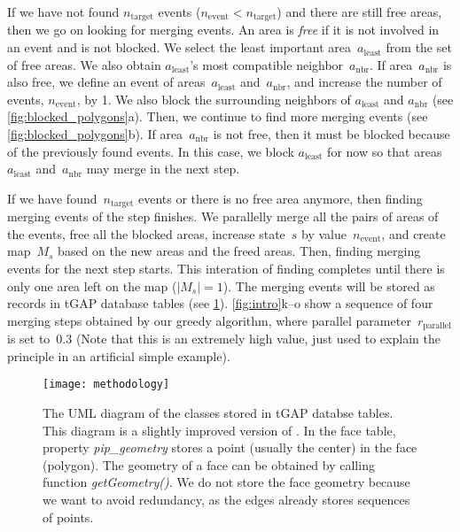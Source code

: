 \documentclass[ijgi,article,submit,moreauthors,pdftex]{Definitions/mdpi}
\begin{document}
If we have not found $n_\mathrm{target}$ events 
($n_\mathrm{event} < n_\mathrm{target}$)
and there are still free areas,
then we go on looking for merging events.
An area is \emph{free} if 
it is not involved in an event and is not blocked.
We select the least important area~$a_\mathrm{least}$
from the set of free areas.
We also obtain $a_\mathrm{least}$'s 
most compatible neighbor~$a_\mathrm{nbr}$.
If area~$a_\mathrm{nbr}$ is also free, 
we define an event of areas~$a_\mathrm{least}$ and~$a_\mathrm{nbr}$,
and increase the number of events, $n_\mathrm{event}$, by 1.
We also block the surrounding neighbors of $a_\mathrm{least}$ and $a_\mathrm{nbr}$
(see \fig\ref{fig:blocked_polygons}a).
Then, we continue to find more merging events
(see \fig\ref{fig:blocked_polygons}b).
If area~$a_\mathrm{nbr}$ is not free,
then it must be blocked because of the previously found events.
In this case, we block $a_\mathrm{least}$ for now
so that areas~$a_\mathrm{least}$ and~$a_\mathrm{nbr}$ 
may merge in the next step.

If we have found~$n_\mathrm{target}$ events 
or there is no free area anymore,
then finding merging events of the step finishes.
We parallelly merge all the pairs of areas of the events,
free all the blocked areas,
increase state~$s$ by value~$n_\mathrm{event}$,
and create map~$M_s$ based on the new areas and the freed areas.
Then, finding merging events for the next step starts.
This interation of finding completes 
until there is only one area left on the map ($|M_s|=1$).
The merging events will be stored as records in tGAP database tables
(see \fig\ref{fig:uml_tgap}).
\figs\ref{fig:intro}k--o show a sequence of four merging steps
obtained by our greedy algorithm,
where parallel parameter~$r_\mathrm{parallel}$ is set to~$0.3$
(Note that this is an extremely high value, 
just used to explain the principle in an artificial simple example).



\begin{figure}[tb]
\centering
\texttt{[image: methodology]}
\caption{The UML diagram of the classes stored in tGAP databse tables.
This diagram is a slightly improved version of \citet[]{Meijers2011Thesis}.
In the face table, property \emph{pip\_geometry} 
stores a point (usually the center) in the face (polygon).
The geometry of a face can be obtained by calling function \emph{getGeometry()}.
We do not store the face geometry because we want to avoid redundancy,
as the edges already stores sequences of points.
}
\label{fig:uml_tgap}
\end{figure}
\end{document}
